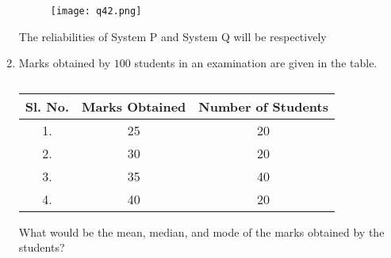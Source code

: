 \documentclass[journal,12pt,onecolumn]{IEEEtran}
\theoremstyle{remark}
\begin{document}
\begin{enumerate}
    \begin{figure}[H]
        \centering
        \texttt{[image: q42.png]}
        \caption*{}
        \label{fig:q42}
    \end{figure}
    
    The reliabilities of System P and System Q will be respectively
    
    \hfill{}
    \begin{enumerate}
    \end{enumerate}

    \item Marks obtained by $100$ students in an examination are given in the table.
    
    \begin{table}[H]
        \centering
        \caption*{}
        \label{tab:q43}
        \begin{tabular}{ccc}
            \hline
            \textbf{Sl. No.} & \textbf{Marks Obtained} & \textbf{Number of Students} \\
            \hline
            1. & 25 & 20 \\
            2. & 30 & 20 \\
            3. & 35 & 40 \\
            4. & 40 & 20 \\
            \hline
        \end{tabular}
    \end{table}
    
    What would be the mean, median, and mode of the marks obtained by the students?
    
    \hfill{}
    \begin{enumerate}
    \end{enumerate}


\end{enumerate}
\end{document}
